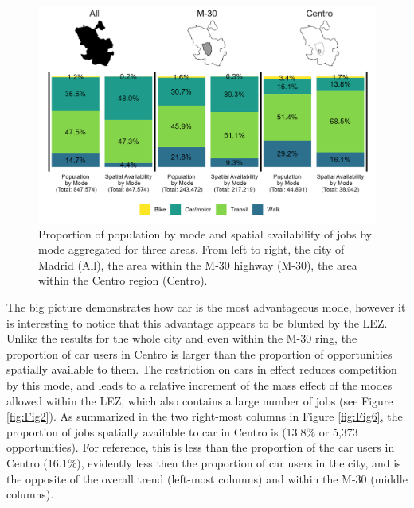 \documentclass[10pt,letterpaper]{article}
\begin{document}
\begin{figure}

{\centering \includegraphics[width=0.85\linewidth]{images/modal_V_comps_4plot} 

}

\caption{\label{fig:Fig6} Proportion of population by mode and spatial availability of jobs by mode aggregated for three areas. From left to right, the city of Madrid (All), the area within the M-30 highway (M-30), the area within the Centro region (Centro).}\label{fig:modal-V-comps-plot}
\end{figure}

The big picture demonstrates how car is the most advantageous mode,
however it is interesting to notice that this advantage appears to be
blunted by the LEZ. Unlike the results for the whole city and even
within the M-30 ring, the proportion of car users in Centro is larger
than the proportion of opportunities spatially available to them. The
restriction on cars in effect reduces competition by this mode, and
leads to a relative increment of the mass effect of the modes allowed
within the LEZ, which also contains a large number of jobs (see Figure
\ref{fig:Fig2}). As summarized in the two right-most columns in Figure
\ref{fig:Fig6}, the proportion of jobs spatially available to car in
Centro is (13.8\% or 5,373 opportunities). For reference, this is less
than the proportion of the car users in Centro (16.1\%), evidently less
then the proportion of car users in the city, and is the opposite of the
overall trend (left-most columns) and within the M-30 (middle columns).
\end{document}
